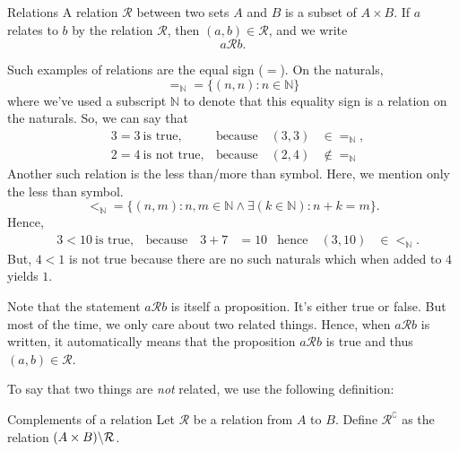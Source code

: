 \begin{df}{Relations}{}
  A relation \(\mathcal{R}\) between two sets \(A\) and \(B\) is a subset of \(A \times B\). If
  \(a\) relates to \(b\) by the relation \(\mathcal{R}\), then \((a, b) \in \mathcal{R}\), and we
  write
  \begin{equation}
    a \mathrel{\mathcal{R}} b.
  \end{equation}
\end{df}

Such examples of relations are the equal sign (\(=\)). On the naturals,
\begin{equation}
  \mathord{=_{\mathbb{N}}} = \{(n, n) : n \in \mathbb{N}\}
\end{equation}
where we've used a subscript \(\mathbb{N}\) to denote that this equality sign is a relation on the
naturals. So, we can say that
\begin{align}
  & 3 = 3 ~ \textrm{is true},     & \textrm{because} \quad (3, 3) & \in \mathord{=_{\mathbb{N}}},   \\
  & 2 = 4 ~ \textrm{is not true}, & \textrm{because} \quad (2, 4) & \notin \mathord{=_{\mathbb{N}}}
\end{align}
Another such relation is the less than/more than symbol. Here, we mention only the less than symbol.
\begin{equation}
  \mathord{<_{\mathbb{N}}} = \{(n, m) : n, m \in \mathbb{N} \land \exists (k \in \mathbb{N}) : n + k = m\}.
\end{equation}
Hence,
\begin{align}
  & 3 < 10 ~ \textrm{is true}, & \textrm{because} \quad 3 + 7 & = 10 & \textrm{hence} \quad (3, 10) & \in \mathord{<_{\mathbb{N}}}.
\end{align}
But, \(4 < 1\) is not true because there are no such naturals which when added to \(4\) yields
\(1\).

Note that the statement \(a \mathrel{\mathcal{R}} b\) is itself a proposition. It's either true or
false. But most of the time, we only care about two related things. Hence, when
\(a \mathrel{\mathcal{R}} b\) is written, it automatically means that the proposition
\(a \mathrel{\mathcal{R}} b\) is true and thus \((a, b) \in \mathcal{R}\).

To say that two things are \emph{not} related, we use the following definition:
\begin{df}{Complements of a relation}{}
  Let \(\mathcal{R}\) be a relation from \(A\) to \(B\). Define \(\mathcal{R}^\complement\) as the
  relation \((A \times B) \backslash \mathcal{R}\).
\end{df}


